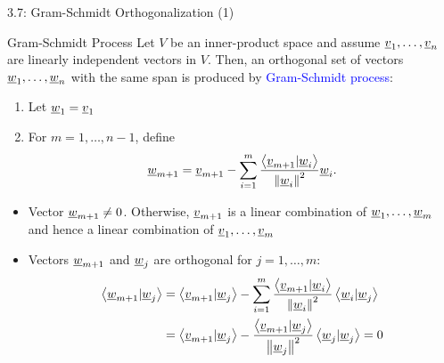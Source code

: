 \documentclass[10pt,letterpaper,english]{beamer}
\begin{document}
\begin{frame}{3.7: Gram-Schmidt Orthogonalization (1)}

\begin{block}{Gram-Schmidt Process}
Let $V$ be an inner-product space and assume $\underline{v}_1, \ldots, \underline{v}_n$ are linearly independent vectors in $V$.
Then, an orthogonal set of vectors $\underline{w}_1, \ldots, \underline{w}_n$ with the same span is produced by \textcolor{blue}{Gram-Schmidt process}:
\begin{enumerate}
\item Let $\underline{w}_1 = \underline{v}_1$

\item For $m=1,\ldots,n-1$, define \vspace{-3.5mm}
\begin{equation*}
\underline{w}_{m+1} = \underline{v}_{m+1} - \sum_{i=1}^m \frac{ \left\langle \underline{v}_{m+1} | \underline{w}_i \right\rangle } { \left\| \underline{w}_i \right\|^2 } \underline{w}_i.
\end{equation*}
\end{enumerate}
\end{block}

\begin{itemize}
\item<2-> Vector $\underline{w}_{m+1} \neq 0$. Otherwise, $\underline{v}_{m+1}$ is a linear combination of $\underline{w}_1, \ldots, \underline{w}_m$ and hence a linear combination of $\underline{v}_1, \ldots, \underline{v}_m$ \vspace{2.5mm}

\item<3-> Vectors $\underline{w}_{m+1}$ and $\underline{w}_j$ are orthogonal for $j=1,\ldots,m$: \vspace{-1.5mm}
\begin{equation*}
\begin{split}
\left\langle \underline{w}_{m+1} | \underline{w}_j \right\rangle
&= \left\langle \underline{v}_{m+1} | \underline{w}_j \right\rangle
- \sum_{i=1}^m \frac{ \left\langle \underline{v}_{m+1} | \underline{w}_i \right\rangle } { \left\| \underline{w}_i \right\|^2 }
\left\langle \underline{w}_i | \underline{w}_j \right\rangle \\
&= \left\langle \underline{v}_{m+1} | \underline{w}_j \right\rangle
- \frac{ \left\langle \underline{v}_{m+1} | \underline{w}_j \right\rangle } { \left\| \underline{w}_j \right\|^2 }
\left\langle \underline{w}_j | \underline{w}_j \right\rangle = 0
\end{split}
\end{equation*}

\end{itemize}

\end{frame}
\end{document}
